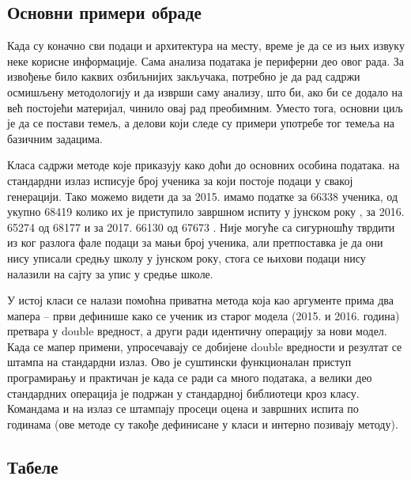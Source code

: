\subsection{Основни примери обраде}

Када су коначно сви подаци и архитектура на месту, време је да се из њих извуку неке корисне информације. Сама анализа података је периферни део овог рада. За извођење било каквих озбиљнијих закључака, потребно је да рад садржи осмишљену методологију и да изврши саму анализу, што би, ако би се додало на већ постојећи материјал, чинило овај рад преобимним. Уместо тога, основни циљ је да се постави темељ, а делови који следе су примери употребе тог темеља на базичним задацима.

Класа  садржи методе које приказују како доћи до основних особина података.  на стандардни излаз исписује број ученика за који постоје подаци у свакој генерацији. Тако можемо видети да за 2015. имамо податке за 66338 ученика, од укупно 68419 колико их је приступило завршном испиту у јунском року \citep{izvestaj15}, за 2016. 65274 од 68177 \citep{izvestaj16manjine} и за 2017. 66130 од 67673 \citep{izvestaj17manjine}. Није могуће са сигурношћу тврдити из ког разлога фале подаци за мањи број ученика, али претпоставка је да они нису уписали средњу школу у јунском року, стога се њихови подаци нису налазили на сајту за упис у средње школе.

У истој класи се налази помоћна приватна метода  која као аргументе прима два мапера -- први дефинише како се ученик из старог модела (2015. и 2016. година) претвара у double вредност, а други ради идентичну операцију за нови модел. Када се мапер примени, упросечавају се добијене double вредности и резултат се штампа на стандардни излаз. Ово је суштински функционалан приступ програмирању и практичан је када се ради са много података, а велики део стандардних операција је подржан у стандардној библиотеци кроз  класу. Командама  и  на излаз се штампају просеци оцена и завршних испита по годинама (ове методе су такође дефинисане у класи  и интерно позивају  методу).

\subsection{Табеле}\label{subs:spreadsheets}


